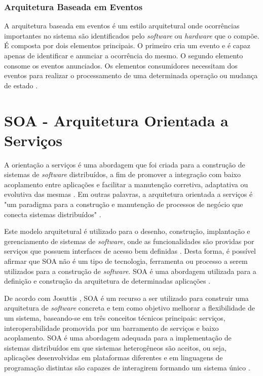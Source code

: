 \subsubsection{Arquitetura Baseada em Eventos}
A arquitetura baseada em eventos é um estilo arquitetural onde ocorrências importantes no sistema são identificados pelo \textit{software} ou \textit{hardware} que o compõe. É composta por dois elementos principais. O primeiro cria um evento e é capaz apenas de identificar e anunciar a ocorrência do mesmo. O segundo elemento consome os eventos anunciados. Os elementos consumidores necessitam dos eventos para realizar o processamento de uma determinada operação ou mudança de estado \cite{rouse}.

\section{SOA - Arquitetura Orientada a Serviços}
A orientação a serviços é uma abordagem que foi criada para a construção de sistemas de \textit{software} distribuídos, a fim de promover a integração com baixo acoplamento entre aplicações e facilitar a manutenção corretiva, adaptativa ou evolutiva das mesmas \cite{linthicum_soainrealworld_2007}. Em outras palavras, a arquitetura orientada a serviços é "um paradigma para a construção e manutenção de processos de negócio que conecta sistemas distribuídos" \cite{josuttis_soa_2007}.

Este modelo arquitetural é utilizado para o desenho, construção, implantação e gerenciamento de sistemas de \textit{software}, onde as funcionalidades são providas por serviços que possuem interfaces de acesso bem definidas \cite{lewis_getting_2010}. Desta forma, é possível afirmar que SOA não é um tipo de tecnologia, ferramenta ou processo a serem utilizados para a construção de \textit{software}. SOA é uma abordagem utilizada para a definição e construção da arquitetura de determinadas aplicações \cite{oliveira_interoperabilidade}.

De acordo com Josuttis \cite{josuttis_soa_2007}, SOA é um recurso a ser utilizado para construir uma arquitetura de \textit{software} concreta e tem como objetivo melhorar a flexibilidade de um sistema, baseando-se em três conceitos técnicos principais: serviços, interoperabilidade promovida por um barramento de serviços e baixo acoplamento. SOA é uma abordagem adequada para a implementação de sistemas distribuídos em que sistemas heterogêneos são aceitos, ou seja, aplicações desenvolvidas em plataformas diferentes e em linguagens de programação distintas são capazes de interagirem formando um sistema único \cite{josuttis_soa_2007}.

